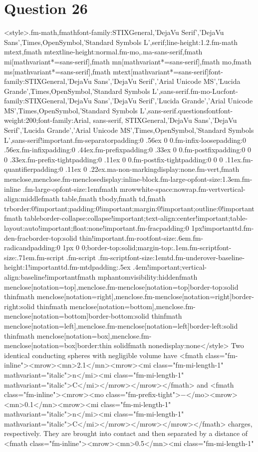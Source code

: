 \documentclass{article}
\begin{document}
\section*{Question 26}
<style>.fm-math,fmath{font-family:STIXGeneral,'DejaVu Serif','DejaVu Sans',Times,OpenSymbol,'Standard Symbols L',serif;line-height:1.2}.fm-math mtext,fmath mtext{line-height:normal}.fm-mo,.ma-sans-serif,fmath mi[mathvariant*=sans-serif],fmath mn[mathvariant*=sans-serif],fmath mo,fmath ms[mathvariant*=sans-serif],fmath mtext[mathvariant*=sans-serif]{font-family:STIXGeneral,'DejaVu Sans','DejaVu Serif','Arial Unicode MS','Lucida Grande',Times,OpenSymbol,'Standard Symbols L',sans-serif}.fm-mo-Luc{font-family:STIXGeneral,'DejaVu Sans','DejaVu Serif','Lucida Grande','Arial Unicode MS',Times,OpenSymbol,'Standard Symbols L',sans-serif}.questionsfont{font-weight:200;font-family:Arial, sans-serif, STIXGeneral,'DejaVu Sans','DejaVu Serif','Lucida Grande','Arial Unicode MS',Times,OpenSymbol,'Standard Symbols L',sans-serif!important}.fm-separator{padding:0 .56ex 0 0}.fm-infix-loose{padding:0 .56ex}.fm-infix{padding:0 .44ex}.fm-prefix{padding:0 .33ex 0 0}.fm-postfix{padding:0 0 0 .33ex}.fm-prefix-tight{padding:0 .11ex 0 0}.fm-postfix-tight{padding:0 0 0 .11ex}.fm-quantifier{padding:0 .11ex 0 .22ex}.ma-non-marking{display:none}.fm-vert,fmath menclose,menclose.fm-menclose{display:inline-block}.fm-large-op{font-size:1.3em}.fm-inline .fm-large-op{font-size:1em}fmath mrow{white-space:nowrap}.fm-vert{vertical-align:middle}fmath table,fmath tbody,fmath td,fmath tr{border:0!important;padding:0!important;margin:0!important;outline:0!important}fmath table{border-collapse:collapse!important;text-align:center!important;table-layout:auto!important;float:none!important}.fm-frac{padding:0 1px!important}td.fm-den-frac{border-top:solid thin!important}.fm-root{font-size:.6em}.fm-radicand{padding:0 1px 0 0;border-top:solid;margin-top:.1em}.fm-script{font-size:.71em}.fm-script .fm-script .fm-script{font-size:1em}td.fm-underover-base{line-height:1!important}td.fm-mtd{padding:.5ex .4em!important;vertical-align:baseline!important}fmath mphantom{visibility:hidden}fmath menclose[notation=top],menclose.fm-menclose[notation=top]{border-top:solid thin}fmath menclose[notation=right],menclose.fm-menclose[notation=right]{border-right:solid thin}fmath menclose[notation=bottom],menclose.fm-menclose[notation=bottom]{border-bottom:solid thin}fmath menclose[notation=left],menclose.fm-menclose[notation=left]{border-left:solid thin}fmath menclose[notation=box],menclose.fm-menclose[notation=box]{border:thin solid}fmath none{display:none}</style> Two identical conducting spheres with negligible volume have <fmath class="fm-inline"><mrow><mn>2.1</mn><mrow><mi class="fm-mi-length-1" mathvariant="italic">n</mi><mi class="fm-mi-length-1" mathvariant="italic">C</mi></mrow></mrow></fmath> and <fmath class="fm-inline"><mrow><mo class="fm-prefix-tight">−</mo><mrow><mn>0.1</mn><mrow><mi class="fm-mi-length-1" mathvariant="italic">n</mi><mi class="fm-mi-length-1" mathvariant="italic">C</mi></mrow></mrow></mrow></fmath> charges, respectively. They are brought into contact and then separated by a distance of <fmath class="fm-inline"><mrow><mn>0.5</mn><mi class="fm-mi-length-1" 
\end{document}
